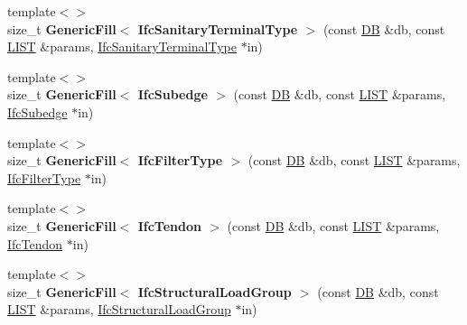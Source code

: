 \begin{DoxyCompactItemize}
\item 
\hypertarget{namespace_assimp_1_1_s_t_e_p_a3e1e76fe0e69e68f50d9a46dff1bb4aa}{{\footnotesize template$<$$>$ }\\size\+\_\+t {\bfseries Generic\+Fill$<$ Ifc\+Sanitary\+Terminal\+Type $>$} (const \hyperlink{class_assimp_1_1_s_t_e_p_1_1_d_b}{D\+B} \&db, const \hyperlink{class_assimp_1_1_s_t_e_p_1_1_e_x_p_r_e_s_s_1_1_l_i_s_t}{L\+I\+S\+T} \&params, \hyperlink{struct_assimp_1_1_i_f_c_1_1_ifc_sanitary_terminal_type}{Ifc\+Sanitary\+Terminal\+Type} $\ast$in)}\label{namespace_assimp_1_1_s_t_e_p_a3e1e76fe0e69e68f50d9a46dff1bb4aa}

\item 
\hypertarget{namespace_assimp_1_1_s_t_e_p_a9a4c54742a132ed159fe34b0c887fb3e}{{\footnotesize template$<$$>$ }\\size\+\_\+t {\bfseries Generic\+Fill$<$ Ifc\+Subedge $>$} (const \hyperlink{class_assimp_1_1_s_t_e_p_1_1_d_b}{D\+B} \&db, const \hyperlink{class_assimp_1_1_s_t_e_p_1_1_e_x_p_r_e_s_s_1_1_l_i_s_t}{L\+I\+S\+T} \&params, \hyperlink{struct_assimp_1_1_i_f_c_1_1_ifc_subedge}{Ifc\+Subedge} $\ast$in)}\label{namespace_assimp_1_1_s_t_e_p_a9a4c54742a132ed159fe34b0c887fb3e}

\item 
\hypertarget{namespace_assimp_1_1_s_t_e_p_a8888487ba3d9d7daa4771ac0f7b8c2db}{{\footnotesize template$<$$>$ }\\size\+\_\+t {\bfseries Generic\+Fill$<$ Ifc\+Filter\+Type $>$} (const \hyperlink{class_assimp_1_1_s_t_e_p_1_1_d_b}{D\+B} \&db, const \hyperlink{class_assimp_1_1_s_t_e_p_1_1_e_x_p_r_e_s_s_1_1_l_i_s_t}{L\+I\+S\+T} \&params, \hyperlink{struct_assimp_1_1_i_f_c_1_1_ifc_filter_type}{Ifc\+Filter\+Type} $\ast$in)}\label{namespace_assimp_1_1_s_t_e_p_a8888487ba3d9d7daa4771ac0f7b8c2db}

\item 
\hypertarget{namespace_assimp_1_1_s_t_e_p_a58954980711bb992ecf44a20e9b74488}{{\footnotesize template$<$$>$ }\\size\+\_\+t {\bfseries Generic\+Fill$<$ Ifc\+Tendon $>$} (const \hyperlink{class_assimp_1_1_s_t_e_p_1_1_d_b}{D\+B} \&db, const \hyperlink{class_assimp_1_1_s_t_e_p_1_1_e_x_p_r_e_s_s_1_1_l_i_s_t}{L\+I\+S\+T} \&params, \hyperlink{struct_assimp_1_1_i_f_c_1_1_ifc_tendon}{Ifc\+Tendon} $\ast$in)}\label{namespace_assimp_1_1_s_t_e_p_a58954980711bb992ecf44a20e9b74488}

\item 
\hypertarget{namespace_assimp_1_1_s_t_e_p_a0d1d74c21b5bba95f3934cc10a76c2e0}{{\footnotesize template$<$$>$ }\\size\+\_\+t {\bfseries Generic\+Fill$<$ Ifc\+Structural\+Load\+Group $>$} (const \hyperlink{class_assimp_1_1_s_t_e_p_1_1_d_b}{D\+B} \&db, const \hyperlink{class_assimp_1_1_s_t_e_p_1_1_e_x_p_r_e_s_s_1_1_l_i_s_t}{L\+I\+S\+T} \&params, \hyperlink{struct_assimp_1_1_i_f_c_1_1_ifc_structural_load_group}{Ifc\+Structural\+Load\+Group} $\ast$in)}\label{namespace_assimp_1_1_s_t_e_p_a0d1d74c21b5bba95f3934cc10a76c2e0}


\end{DoxyCompactItemize}
